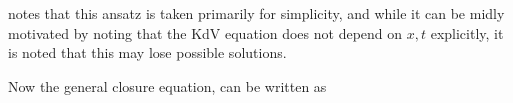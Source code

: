 \documentclass{article}
\begin{document}
\begin{remark}
	\cite{Wahlquist1975} notes that this ansatz is taken primarily for simplicity, and while it can be midly motivated by noting that the KdV equation does not depend on $x,t$ explicitly, it is noted that this may lose possible solutions. 
\end{remark}  

Now the general closure equation, can be written as 





\end{document}
